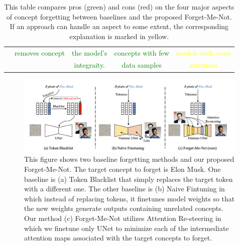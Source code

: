 \begin{table}[h]
\begin{tabular}{|l|c|c|c|c|}
                          & \textcolor{green}{removes concept}       & \textcolor{green}{the model's}                                   & \textcolor{green}{concepts with few }                         & \textcolor{yellow}{models with cross}                     \\
                          &                                          & \textcolor{green}{integraity.}               & \textcolor{green}{data samples}                               & \textcolor{yellow}{attention}            \\ \hline
    \end{tabular}
    \caption{This table compares pros (green) and cons (red) on the four major aspects of concept forgetting between baselines and the proposed Forget-Me-Not. If an approach can handle an aspect to some extent, the corresponding explanation is marked in yellow. \cite*{zhang2023forgetmenot}}
    \end{table}
    

\begin{figure}[H]
    \centering
    \includegraphics[width=1\textwidth]{images/concept_removal_comp.png}
    \caption{ This figure shows two baseline forgetting methods and our proposed Forget-Me-Not. The target concept to forget is Elon Musk.
    One baseline is (a) Token Blacklist that simply replaces the target token with a different one. The other baseline is (b) Naive Fintuning in
    which instead of replacing tokens, it finetunes model weights so that the new weights generate outputs containing unrelated concepts. Our
    method (c) Forget-Me-Not utilizes Attention Re-steering in which we finetune only UNet to minimize each of the intermediate attention
    maps associated with the target concepts to forget. \cite*{zhang2023forgetmenot}}
\end{figure}

